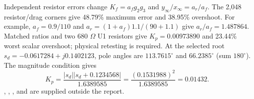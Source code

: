 Independent resistor errors change $K_f=a_fg_2g_3$ and $y_\infty/x_\infty=a_r/a_f$. The 2,048 resistor/drag corners give 48.79\% maximum error and 38.95\% overshoot. For example, $a_f=0.9/110$ and $a_r=(1+a_f)1.1/(90+1.1)$ give $a_r/a_f=1.487864$. Matched ratios and two 680 $\Omega$ U1 resistors give $K_p=0.00973890$ and 23.44\% worst scalar overshoot; physical retesting is required.
At the selected root $s_d=-0.0617284+j0.1402123$, pole angles are $113.7615^\circ$ and $66.2385^\circ$ (sum $180^\circ$). The magnitude condition gives
\begin{equation}
K_p=\frac{|s_d||s_d+0.1234568|}{1.6389585}=\frac{(0.1531988)^2}{1.6389585}=0.01432.
\end{equation}
, , ,  and  are supplied outside the report.
